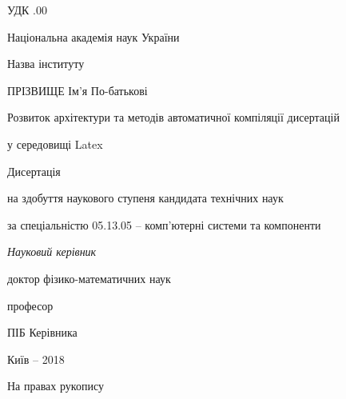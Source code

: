 \documentclass[a4paper,14pt]{extreport}
\begin{document}


\frontmatter 

\thispagestyle{empty}

УДК .00

 \begin{centering}
  \linespread{1.1}
  \vspace{2em}

{Національна академія наук України

Назва інституту}

  \vspace{5em}

ПРІЗВИЩЕ Ім'я По-батькові

  \vspace{2em}

Розвиток архітектури та методів автоматичної компіляції дисертацій

у середовищі Latex

  \vspace{5em}


Дисертація 

на здобуття наукового ступеня кандидата технічних наук

за спеціальністю 05.13.05 -- комп'ютерні системи та компоненти


  \vspace{2em}

\textit{Науковий керівник}

доктор фізико-математичних наук

професор

ПІБ Керівника

\vspace{11em}

  Київ -- 2018

 \end{centering}
\begin{flushright}
 На правах рукопису
\end{flushright} 

\tableofcontents



\mainmatter %

% 

\backmatter

% 
\end{document}
